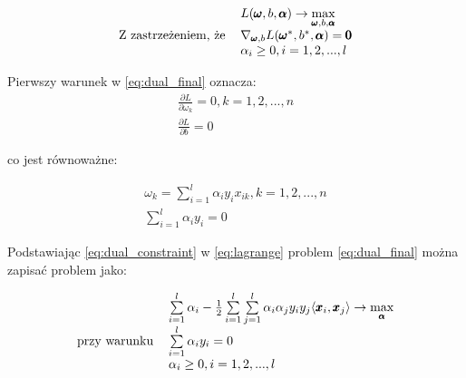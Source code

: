 \documentclass[paper=a4, fontsize=11pt]{scrartcl} %
\numberwithin{equation}{section} %
\numberwithin{figure}{section} %
\begin{document}
    \begin{equation} \label{eq:dual_final}
        \begin{tabular}{rl}
            & $L(\pmb{\omega},b,\pmb{\alpha}) \rightarrow
            \max\limits_{\pmb{\omega},b,\pmb{\alpha}}$ \\
            Z zastrzeżeniem, że & $\nabla_{\pmb{\omega},b} L(\pmb{\omega}^*,b^*,\pmb{\alpha}) =
            \pmb{0}$ \\
                               & $\alpha_i \geq 0, i=1,2,...,l$
        \end{tabular}
    \end{equation}

    \par Pierwszy warunek w \ref{eq:dual_final} oznacza:
    \begin{equation}
        \begin{split}
            \frac{\partial L}{\partial \omega_k}=0,k=1,2,...,n \\
            \frac{\partial L}{\partial b}=0
        \end{split}
    \end{equation}

    co jest równoważne:

    \begin{equation} \label{eq:dual_constraint}
        \begin{split}
            \omega_k=\sum\limits_{i=1}^{l} \alpha_i y_i x_{ik}, k=1,2,...,n \\
            \sum\limits_{i=1}^{l} \alpha_i y_i = 0
        \end{split}
    \end{equation}

    \par Podstawiając \ref{eq:dual_constraint} w \ref{eq:lagrange} problem \ref{eq:dual_final}
    można zapisać problem \label{eq:dual_final} jako:

    \begin{equation} \label{eq:dual_final_coordinate}
        \begin{tabular}{rl}
            & $\sum\limits_{i=1}^{l}\alpha_i -
            \frac{1}{2}\sum\limits_{i=1}^{l}\sum\limits_{j=1}^{l}\alpha_i\alpha_j y_i y_j
            \langle \pmb{x}_i,\pmb{x}_j \rangle \rightarrow \max\limits_{\pmb{\alpha}}$ \\
            przy warunku & $\sum\limits_{i=1}^{l} \alpha_i y_i = 0$ \\
                               & $\alpha_i \geq 0, i=1,2,...,l$
        \end{tabular}
    \end{equation}
\end{document}
